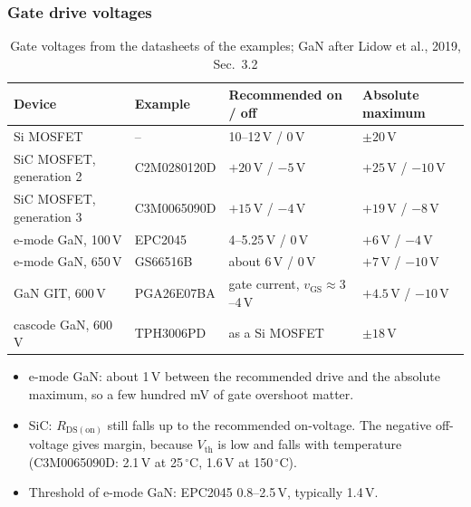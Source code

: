 \begin{frame}
	\frametitle{Gate drive voltages}
	\begin{table}
		\centering
		\footnotesize
		\begin{tabular}{|l|l|l|l|}
			\hline
			\textbf{Device}           & \textbf{Example} & \textbf{Recommended on / off}                  & \textbf{Absolute maximum} \\
			\hline
			Si MOSFET                 & --               & 10--12\,V / 0\,V                               & $\pm20$\,V                \\
			SiC MOSFET, generation 2  & C2M0280120D      & $+20$\,V / $-5$\,V                             & $+25$\,V / $-10$\,V       \\
			SiC MOSFET, generation 3  & C3M0065090D      & $+15$\,V / $-4$\,V                             & $+19$\,V / $-8$\,V        \\
			e-mode GaN, 100\,V        & EPC2045          & 4--5.25\,V / 0\,V                              & $+6$\,V / $-4$\,V         \\
			e-mode GaN, 650\,V        & GS66516B         & about 6\,V / 0\,V                              & $+7$\,V / $-10$\,V        \\
			GaN GIT, 600\,V           & PGA26E07BA       & gate current, $v_\mathrm{GS}\approx3$--4\,V    & $+4.5$\,V / $-10$\,V      \\
			cascode GaN, 600\,V       & TPH3006PD        & as a Si MOSFET                                 & $\pm18$\,V                \\
			\hline
		\end{tabular}
		\caption{Gate voltages from the datasheets of the examples; GaN after Lidow et al., 2019, Sec.\ 3.2}
	\end{table}
	\small
	\begin{itemize}
		\item e-mode GaN: about 1\,V between the recommended drive and the absolute maximum, so a few hundred mV of gate overshoot matter.
		\item SiC: $R_\mathrm{DS(on)}$ still falls up to the recommended on-voltage. The negative off-voltage gives margin, because $V_\mathrm{th}$ is low and falls with temperature (C3M0065090D: 2.1\,V at 25\,$^\circ$C, 1.6\,V at 150\,$^\circ$C).
		\item Threshold of e-mode GaN: EPC2045 0.8--2.5\,V, typically 1.4\,V.
	\end{itemize}
\end{frame}

